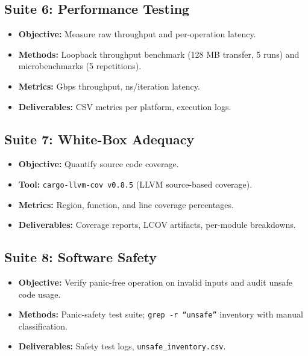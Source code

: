 \documentclass[11pt,a4paper]{article}
\begin{document}
\subsection{Suite 6: Performance Testing}

\begin{itemize}[noitemsep]
\item \textbf{Objective:} Measure raw throughput and per-operation latency.
\item \textbf{Methods:} Loopback throughput benchmark (128 MB transfer, 5 runs) and microbenchmarks (5 repetitions).
\item \textbf{Metrics:} Gbps throughput, ns/iteration latency.
\item \textbf{Deliverables:} CSV metrics per platform, execution logs.
\end{itemize}

\subsection{Suite 7: White-Box Adequacy}

\begin{itemize}[noitemsep]
\item \textbf{Objective:} Quantify source code coverage.
\item \textbf{Tool:} \texttt{cargo-llvm-cov v0.8.5} (LLVM source-based coverage).
\item \textbf{Metrics:} Region, function, and line coverage percentages.
\item \textbf{Deliverables:} Coverage reports, LCOV artifacts, per-module breakdowns.
\end{itemize}

\subsection{Suite 8: Software Safety}

\begin{itemize}[noitemsep]
\item \textbf{Objective:} Verify panic-free operation on invalid inputs and audit unsafe code usage.
\item \textbf{Methods:} Panic-safety test suite; \texttt{grep -r ``unsafe''} inventory with manual classification.
\item \textbf{Deliverables:} Safety test logs, \texttt{unsafe\_inventory.csv}.
\end{itemize}

\end{document}
